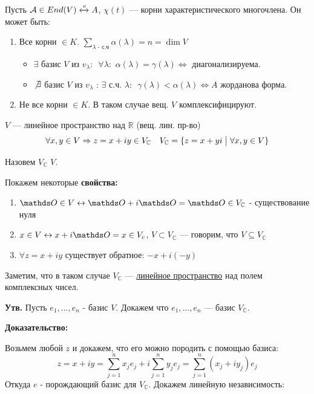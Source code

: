 Пусть $\mathcal{A} \in End(V) \xleftrightarrow{e} A $, $\chi(t)$ --- корни характеристического многочлена. Он может быть:

\begin{enumerate}
    \item Все корни $\in K$. $\sum\limits_{\lambda \text{ - с.ч}}\alpha(\lambda) = n  = \dim V$
    \begin{itemize}
        \item $\exists$ базис $V$ из $v_{\lambda} $: $\,\,\forall \lambda:\,\,\alpha(\lambda)=\gamma(\lambda) \iff$ диагонализируема.
        \item $\not \exists $ базис $V$ из $v_{\lambda} \,\,$: $\exists $ с.ч. $\lambda$: $\,\, \gamma(\lambda) < \alpha(\lambda) \iff A$ жорданова форма.
    \end{itemize}
    \item Не все корни $\in K$. В таком случае вещ. $V$ комплексифицируют.
\end{enumerate}


 $V$ --- линейное пространство над $\mathbb{R}$ (вещ. лин. пр-во)
$$\forall x,y \in V \Rightarrow  z = x+iy \in V_{\mathbb{C}} \quad V_{\mathbb{C}} = \{ z = x+yi \bigm| \forall x,y \in V\}$$

Назовем $V_{\mathbb{C}}$  $V$.

Покажем некоторые \textbf{свойства:}
\begin{enumerate}
    \item $\zero \in V \leftrightarrow \zero + i\zero = \zero \in V_{\mathbb{C}}$ - существование нуля
     \item $x \in V \leftrightarrow x +i\zero = x \in V_c$, $V \subset V_{\mathbb{C}}$ --- говорим, что $V\subseteq  V_{\mathbb{C}}$
    \item $\forall z = x + iy$ существует обратное: $-x+i(-y)$
\end{enumerate}

Заметим, что в таком случае $V_\mathbb{C}$ ---  \uline{линейное пространство} над полем комплексных чисел.


\textbf{Утв.} Пусть $e_1,\ldots,e_n$ - базис $V$. Докажем что $e_1,\ldots, e_n$ --- базис $V_{\mathbb{C}}$.

\textbf{Доказательство:}

Возьмем любой $z$ и докажем, что его можно породить с помощью базиса:
$$z = x + iy = \sum\limits_{j=1}^n x_j e_j + i\sum\limits_{j=1}^ny_j e_j = \sum\limits_{j=1}^n(x_j+iy_j)e_j$$
Откуда $e$ - порождающий базис для $V_{\mathbb{C}}$. Докажем линейную независимость:

